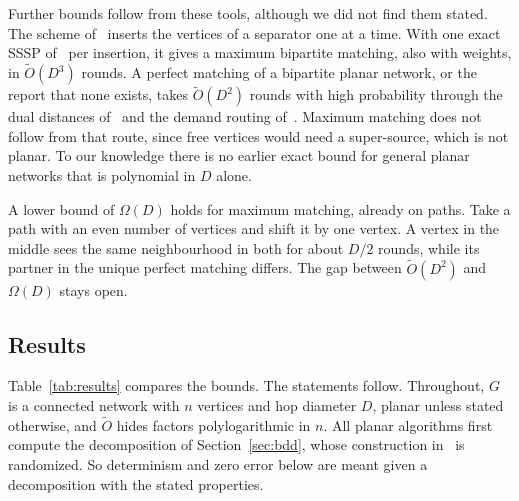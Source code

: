 \documentclass[11pt]{article}
\theoremstyle{definition}
\theoremstyle{remark}
\theoremstyle{plain}
\newcommand{\Ot}{\tilde O}
\begin{document}
Further bounds follow from these tools, although we did not find them stated. The scheme of~\cite{LT80} inserts the
vertices of a separator one at a time. With one exact SSSP of~\cite[Lemma 4]{P20} per insertion, it gives a maximum
bipartite matching, also with weights, in $\Ot(D^3)$ rounds. A perfect matching of a bipartite planar network, or the
report that none exists, takes $\Ot(D^2)$ rounds with high probability through the dual distances of~\cite{ADPW25} and the
demand routing of~\cite{MN95}. Maximum matching does not follow from that route, since free vertices would need a
super-source, which is not planar. To our knowledge there is no earlier exact bound for general planar networks that is polynomial in $D$ alone.

A lower bound of $\Omega(D)$ holds for maximum matching, already on paths. Take a path with an even number of vertices and
shift it by one vertex. A vertex in the middle sees the same neighbourhood in both for about $D/2$ rounds, while its partner
in the unique perfect matching differs. The gap between $\Ot(D^2)$ and $\Omega(D)$ stays open.

\subsection{Results}

Table~\ref{tab:results} compares the bounds. The statements follow. Throughout, $G$ is a connected
network with $n$ vertices and hop diameter $D$, planar unless stated otherwise, and $\Ot$ hides
factors polylogarithmic in $n$. All planar algorithms first compute the decomposition of Section~\ref{sec:bdd}, whose
construction in~\cite{LP19} is randomized. So determinism and zero error below are meant given a decomposition with
the stated properties.
\end{document}
